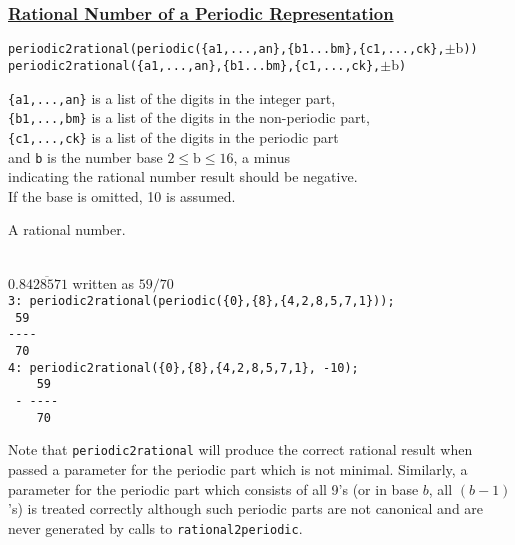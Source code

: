 \subsubsection*{\textbf{\underline{Rational Number of a Periodic Representation}}}

\begin{description}[style=nextline]

\item[\textbf{SYNTAX:}]
  \texttt{periodic2rational(periodic(\{a1,...,an\},\{b1...bm\},\{c1,...,ck\},$\pm{\mathrm{b}}$))}\\
  \texttt{periodic2rational(\{a1,...,an\},\{b1...bm\},\{c1,...,ck\},$\pm{\mathrm{b}}$)}

\item[\textbf{INPUT:}]
  \texttt{\{a1,...,an\}} is a list of the digits in the integer part,\\
  \texttt{\{b1,...,bm\}} is a list of the digits in the non-periodic part,\\
  \texttt{\{c1,...,ck\}} is a list of the digits in the periodic part\\
  and \texttt{b} is the number base $2 \leq \mathrm{b} \leq 16$, a minus\\
  indicating the rational number result should be negative. \\
  If the base is omitted, 10 is assumed.

\item[\textbf{RESULT:}]
  A rational number.

\item[\textbf{EXAMPLES:}]\mbox{}\\
  $0.8\overline{428571}$ written as $59/70$ \\
  \texttt{3: periodic2rational(periodic(\{0\},\{8\},\{4,2,8,5,7,1\}));}
  \\[\baselineskip]
  \texttt{\mbox{}~59}\\
  \texttt{-{}-{}-{}-}\\
  \texttt{\mbox{}~70}\\[\baselineskip]
  \texttt{4: periodic2rational(\{0\},\{8\},\{4,2,8,5,7,1\}, -10);}
  \\[\baselineskip]
  \texttt{\mbox{}~~~~59}\\
  \texttt{\mbox{} -\ -{}-{}-{}-}\\
  \texttt{\mbox{}~~~~70}
\end{description}

Note that \texttt{periodic2rational} will produce the correct rational result
when passed a parameter for the periodic part which is not minimal.
Similarly, a parameter for the periodic part which consists of all 9's
(or in base $b$, all $(b-1)$'s) is treated correctly although such periodic
parts are not canonical and are never generated by calls to
\texttt{rational2periodic}.


